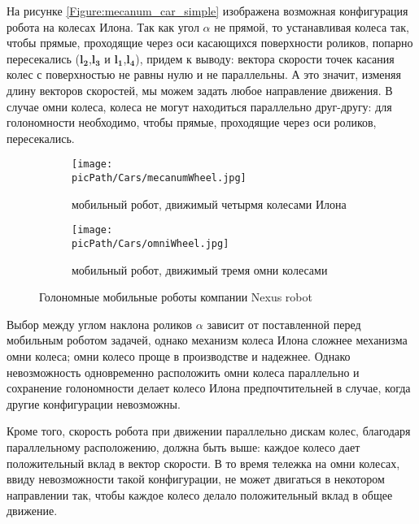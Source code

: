 \documentclass[oneside,final,14pt]{extreport}
\newcommand{\picPath}{img}
\newcommand{\bs}{\boldsymbol}
\begin{document}
На рисунке \ref{Figure:mecanum_car_simple} изображена возможная конфигурация робота на колесах Илона. Так как угол $\alpha$ не прямой, то устанавливая колеса так, чтобы прямые, проходящие через оси касающихся поверхности роликов, попарно пересекались ($\bs{l_{2}}$,$\bs{l_{3}}$ и $\bs{l_{1}}$,$\bs{l_{4}}$), придем к выводу: вектора скорости точек касания колес с поверхностью не равны нулю и не параллельны. А это значит, изменяя длину векторов скоростей, мы можем задать любое направление движения. В случае омни колеса, колеса не могут находиться параллельно друг-другу: для голономности необходимо, чтобы прямые, проходящие через оси роликов, пересекались. 

\begin{figure}[H]
\end{figure}

\begin{figure}[H]
  \centering
  \begin{subfigure}[b]{0.4\linewidth}
   \texttt{[image: \\picPath/Cars/mecanumWheel.jpg]}
    \caption{ мобильный робот, движимый четырмя колесами Илона }
  \end{subfigure}
  \begin{subfigure}[b]{0.4\linewidth}
    \texttt{[image: \\picPath/Cars/omniWheel.jpg]}
    \caption{ мобильный робот, движимый тремя омни колесами }
  \end{subfigure}
  \caption{ Голономные мобильные роботы компании Nexus robot}
  \label{Figure:holonomicRobots}
\end{figure}
Выбор между углом наклона роликов $\alpha$ зависит от поставленной перед мобильным роботом задачей, однако механизм колеса Илона сложнее механизма омни колеса; омни колесо проще в производстве и надежнее. Однако невозможность одновременно расположить омни колеса параллельно и сохранение голономности делает колесо Илона предпочтительней в случае, когда другие конфигурации невозможны.  

Кроме того, скорость робота при движении параллельно дискам колес, благодаря параллельному расположению, должна быть выше: каждое колесо дает положительный вклад в вектор скорости. В то время тележка на омни колесах, ввиду невозможности такой конфигурации, не может двигаться в некотором направлении так, чтобы каждое колесо делало положительный вклад в общее движение.   
\end{document}
